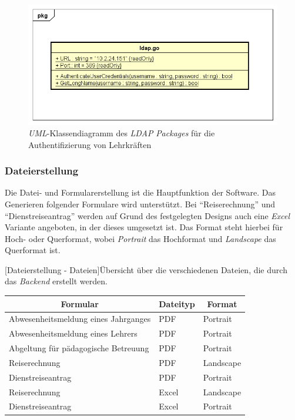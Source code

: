 \begin{figure}[H]
	\centering
	\includegraphics[width=\linewidth]{images/mbeier_konzept/LDAP}
	\caption[\textit{lLDAP} \textit{UML}-Klassendiagramm]{\textit{UML}-Klassendiagramm des \textit{LDAP} \textit{Packages} für die Authentifizierung von Lehrkräften}
	\label{fig:ldap}
\end{figure}

\newpage

\subsubsection{Dateierstellung}

Die Datei- und Formularerstellung ist die Hauptfunktion der Software. Das Generieren folgender Formulare wird unterstützt. Bei \enquote{Reiserechnung} und \enquote{Dienstreiseantrag} werden auf Grund des festgelegten Designs auch eine \textit{Excel} Variante angeboten, in der dieses umgesetzt ist. Das Format steht hierbei für Hoch- oder Querformat, wobei \textit{Portrait} das Hochformat und \textit{Landscape} das Querformat ist.

[Dateierstellung - Dateien]{Übersicht über die verschiedenen Dateien, die durch das \textit{Backend} erstellt werden.}	
\label{tbl:files}
\begin{table}
	\centering
	\begin{tabular}{|l|l|l|}
		\hline
		\multicolumn{1}{|c|}{\textbf{Formular}} & \multicolumn{1}{c|}{\textbf{Dateityp}} & \multicolumn{1}{c|}{\textbf{Format}} \\ \hline
		Abwesenheitsmeldung eines Jahrganges & PDF & Portrait \\ \hline
		Abwesenheitsmeldung eines Lehrers & PDF & Portrait \\ \hline
		Abgeltung für pädagogische Betreuung & PDF & Portrait \\ \hline
		Reiserechnung & PDF & Landscape \\ \hline
		Dienstreiseantrag & PDF & Portrait \\ \hline
		Reiserechnung & Excel & Landscape \\ \hline
		Dienstreiseantrag & Excel & Portrait \\ \hline
	\end{tabular}
\end{table}


